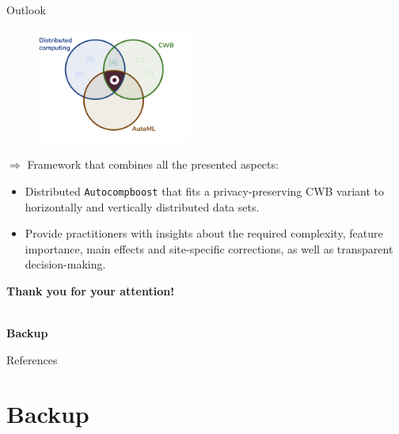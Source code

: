 \documentclass[t,10pt]{beamer}
\newcommand{\fSlide}[2]{
\begin{frame}[plain]{}%
  \vspace{4cm}%
  \Large #1\\[0.2cm]%
  {\LARGE\textbf{#2}}%
	\addtocounter{framenumber}{-1}%
\end{frame}%
}
\newcommand{\backupbegin}{
   \newcounter{finalframe}
   \setcounter{finalframe}{\value{framenumber}}
}
\begin{document}
\begin{frame}{Outlook}
  \begin{figure}
    \centering
    \includegraphics[width=0.45\textwidth]{figures/topics-outlook.png}
  \end{figure}
  $\Rightarrow$ Framework that combines all the presented aspects:
    \begin{itemize}
      \item Distributed \texttt{Autocompboost} that fits a privacy-preserving CWB variant to horizontally and vertically distributed data sets.\vspace{0.1cm}
      \item Provide practitioners with insights about the required complexity, feature importance, main effects and site-specific corrections, as well as transparent decision-making.
    \end{itemize}
    \addtocounter{framenumber}{-1}
\end{frame}

\begin{frame}[plain]{}
    \centering\vspace{4cm}
    {\LARGE\bfseries \color{white}Thank you for your attention!}
    \addtocounter{framenumber}{-1}
\end{frame}


\backupbegin
\fSlide{\phantom{Backup}}{Backup}

\begin{frame}[allowframebreaks]{References}
\nocite{*}
\scriptsize


\end{frame}

\section*{Backup}
\end{document}
